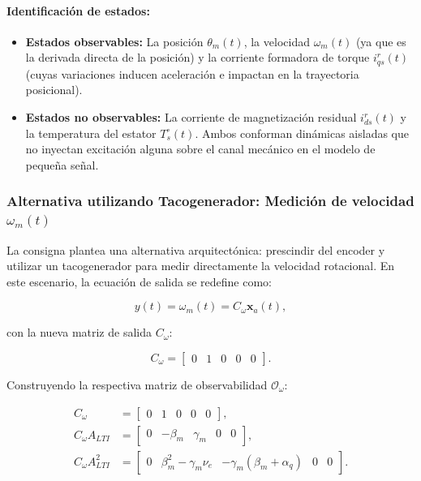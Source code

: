 \documentclass[10pt,a4paper]{article}
\begin{document}
\paragraph{Identificación de estados:}
\begin{itemize}
    \item \textbf{Estados observables:} La posición $\theta_m(t)$, la velocidad $\omega_m(t)$ (ya que es la derivada directa de la posición) y la corriente formadora de torque $i_{qs}^r(t)$ (cuyas variaciones inducen aceleración e impactan en la trayectoria posicional).
    \item \textbf{Estados no observables:} La corriente de magnetización residual $i_{ds}^r(t)$ y la temperatura del estator $T_s^\circ(t)$. Ambos conforman dinámicas aisladas que no inyectan excitación alguna sobre el canal mecánico en el modelo de pequeña señal.
\end{itemize}


\subsubsection{Alternativa utilizando Tacogenerador: Medición de velocidad $\omega_m(t)$}

La consigna plantea una alternativa arquitectónica: prescindir del encoder y utilizar un tacogenerador para medir directamente la velocidad rotacional. En este escenario, la ecuación de salida se redefine como:

\begin{equation}
    y(t) = \omega_m(t) = C_\omega \mathbf{x}_a(t),
\end{equation}

con la nueva matriz de salida $C_\omega$:

\begin{equation}
    C_\omega =
    \begin{bmatrix}
        0 & 1 & 0 & 0 & 0
    \end{bmatrix}.
\end{equation}

Construyendo la respectiva matriz de observabilidad $\mathcal{O}_\omega$:

\begin{align*}
    C_\omega &= \begin{bmatrix} 0 & 1 & 0 & 0 & 0 \end{bmatrix}, \\[2mm]
    C_\omega A_{LTI} &= \begin{bmatrix} 0 & -\beta_m & \gamma_m & 0 & 0 \end{bmatrix}, \\[2mm]
    C_\omega A_{LTI}^2 &= \begin{bmatrix} 0 & \beta_m^2-\gamma_m\nu_e & -\gamma_m(\beta_m+\alpha_q) & 0 & 0 \end{bmatrix}.
\end{align*}
\end{document}
